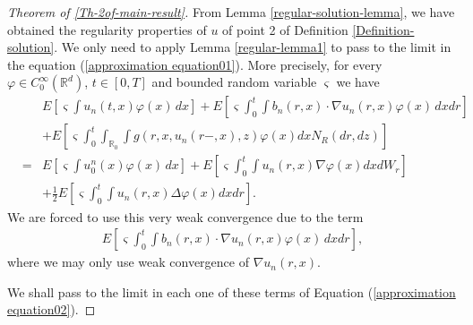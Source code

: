 \documentclass[12pt,oneside, reqno]{amsart}
\newcommand{\be}{\begin{eqnarray}}
\newcommand{\ee}{\end{eqnarray}}
\newcommand{\ce}{\begin{eqnarray*}}
\newcommand{\de}{\end{eqnarray*}}
\def\no{\nonumber}
\def\mR{{\mathbb R}}
\numberwithin{equation}{section}
\begin{document}
\begin{proof}[Theorem of \ref{Th-2of-main-result}]
From Lemma \ref{regular-solution-lemma}, we have obtained the regularity properties of $u$ of point 2 of Definition \ref{Definition-solution}. We only need to apply Lemma \ref{regular-lemma1} to pass to the limit in the equation (\ref{approximation equation01}). More precisely, for every $\varphi \in C_0^{\infty}(\mR^d)$, $t\in [0,T]$ and bounded random variable $\varsigma$  we have 
\be\label{approximation equation02}
&&E\left[\varsigma\int u_n(t,x)\varphi(x)\,dx\right]+E\left[\varsigma\int_0^t\int b_n(r,x)\cdot \nabla u_n(r,x) \varphi(x)\, dx dr\right]  \no\\
&&+E\left[\varsigma\int_0^t\int _{\mR_0}\int g(r,x,u_n(r-,x),z)\varphi(x)dxN_R(dr,dz)\right]\no\\
&=&E\left[\varsigma\int u_0^n(x)\varphi(x)\,dx\right]+E\left[\varsigma\int_0^t\int   u_n(r,x) \nabla\varphi(x) dx dW_r\right]\no\\
&&+\frac{1}{2}E\left[\varsigma\int_0^t\int u_n(r,x) \Delta\varphi(x) dxdr\right].
\ee 
We are forced to use this very weak convergence due to the term 
\ce 
E\left[\varsigma\int_0^t\int b_n(r,x)\cdot \nabla u_n(r,x) \varphi(x)\, dx dr\right],
\de 
where we may only use weak convergence of $\nabla u_n(r,x)$.

We shall pass to the limit in each one of these terms of Equation (\ref{approximation equation02}). 
	

\end{proof}
\end{document}
